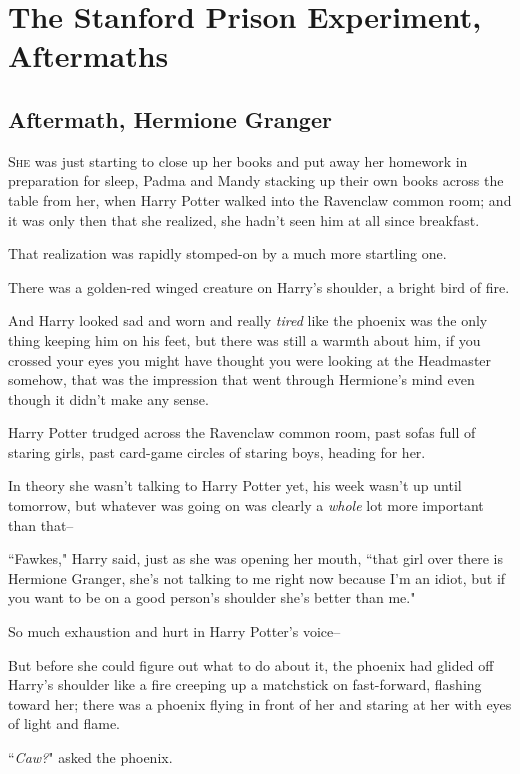 \chapter{The Stanford Prison Experiment, Aftermaths}

\section{Aftermath, Hermione Granger}

\lettrine{S}{he} was just starting to close up her books and put away her homework in preparation for sleep, Padma and Mandy stacking up their own books across the table from her, when Harry Potter walked into the Ravenclaw common room; and it was only then that she realized, she hadn't seen him at all since breakfast.

That realization was rapidly stomped-on by a much more startling one.

There was a golden-red winged creature on Harry's shoulder, a bright bird of fire.

And Harry looked sad and worn and really \emph{tired} like the phoenix was the only thing keeping him on his feet, but there was still a warmth about him, if you crossed your eyes you might have thought you were looking at the Headmaster somehow, that was the impression that went through Hermione's mind even though it didn't make any sense.

Harry Potter trudged across the Ravenclaw common room, past sofas full of staring girls, past card-game circles of staring boys, heading for her.

In theory she wasn't talking to Harry Potter yet, his week wasn't up until tomorrow, but whatever was going on was clearly a \emph{whole} lot more important than that\---

``Fawkes," Harry said, just as she was opening her mouth, ``that girl over there is Hermione Granger, she's not talking to me right now because I'm an idiot, but if you want to be on a good person's shoulder she's better than me."

So much exhaustion and hurt in Harry Potter's voice\---

But before she could figure out what to do about it, the phoenix had glided off Harry's shoulder like a fire creeping up a matchstick on fast-forward, flashing toward her; there was a phoenix flying in front of her and staring at her with eyes of light and flame.

``\emph{Caw?}" asked the phoenix.

